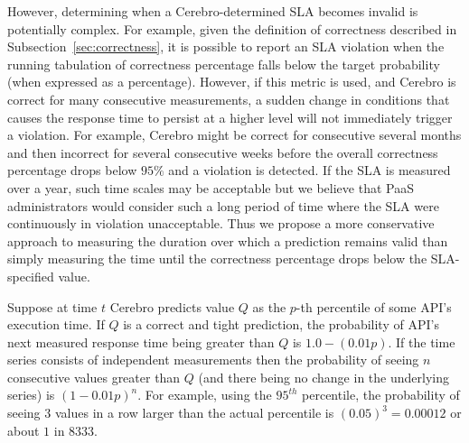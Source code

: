 
However, determining when a Cerebro-determined SLA becomes invalid is
potentially complex. For example, given the definition of correctness
described in Subsection~\ref{sec:correctness}, it is possible to report an SLA violation
when the running tabulation of correctness percentage falls below the target
probability (when expressed as a percentage).  However, if this metric is
used, and Cerebro is correct for many consecutive measurements, a sudden
change in conditions that causes the response time to persist at a higher
level will not immediately trigger a violation.  For example, Cerebro might be
correct for consecutive several months and then incorrect for several
consecutive weeks before the overall correctness percentage drops below $95\%$
and a violation is detected.  If the SLA is measured over a year, such time
scales may be acceptable but we believe that PaaS administrators would
consider such a long period of time where the SLA were continuously in
violation unacceptable.
Thus we propose a more conservative approach to measuring the duration over
which a prediction remains valid than simply measuring the time until the
correctness percentage drops below the SLA-specified value.

Suppose at time $t$ Cerebro predicts value $Q$ as the $p$-th percentile of
some API's execution time.  If $Q$ is a correct and tight prediction,
the probability of API's next measured response time being greater than 
$Q$ is $1.0 - (0.01p)$.  If the time series consists of independent
measurements then the probability of seeing $n$ consecutive values greater
than $Q$ (and there being no change in the underlying series) is $(1-0.01p)^n$. 
For example, using the $95^{th}$ percentile, the probability of seeing $3$
values in a row larger than the actual percentile is $(0.05)^3 = 0.00012$
or about $1$ in $8333$.

